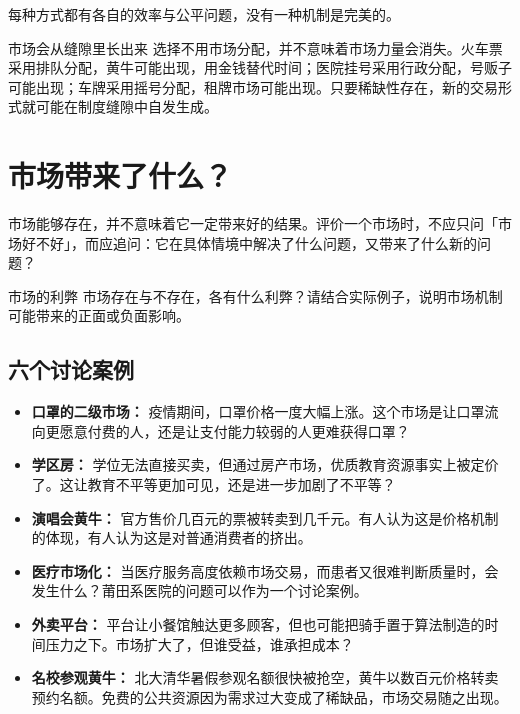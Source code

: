 \documentclass[10pt,a4paper]{ctexart}
\begin{document}
每种方式都有各自的效率与公平问题，没有一种机制是完美的。

\begin{insightbox}{市场会从缝隙里长出来}
选择不用市场分配，并不意味着市场力量会消失。火车票采用排队分配，黄牛可能出现，用金钱替代时间；医院挂号采用行政分配，号贩子可能出现；车牌采用摇号分配，租牌市场可能出现。只要稀缺性存在，新的交易形式就可能在制度缝隙中自发生成。
\end{insightbox}

\section{市场带来了什么？}

市场能够存在，并不意味着它一定带来好的结果。评价一个市场时，不应只问「市场好不好」，而应追问：它在具体情境中解决了什么问题，又带来了什么新的问题？

\begin{discussionbox}{市场的利弊}
市场存在与不存在，各有什么利弊？请结合实际例子，说明市场机制可能带来的正面或负面影响。
\end{discussionbox}

\subsection{六个讨论案例}

\begin{itemize}
  \item \textbf{口罩的二级市场：} 疫情期间，口罩价格一度大幅上涨。这个市场是让口罩流向更愿意付费的人，还是让支付能力较弱的人更难获得口罩？
  \item \textbf{学区房：} 学位无法直接买卖，但通过房产市场，优质教育资源事实上被定价了。这让教育不平等更加可见，还是进一步加剧了不平等？
  \item \textbf{演唱会黄牛：} 官方售价几百元的票被转卖到几千元。有人认为这是价格机制的体现，有人认为这是对普通消费者的挤出。
  \item \textbf{医疗市场化：} 当医疗服务高度依赖市场交易，而患者又很难判断质量时，会发生什么？莆田系医院的问题可以作为一个讨论案例。
  \item \textbf{外卖平台：} 平台让小餐馆触达更多顾客，但也可能把骑手置于算法制造的时间压力之下。市场扩大了，但谁受益，谁承担成本？
  \item \textbf{名校参观黄牛：} 北大清华暑假参观名额很快被抢空，黄牛以数百元价格转卖预约名额。免费的公共资源因为需求过大变成了稀缺品，市场交易随之出现。
\end{itemize}
\end{document}

